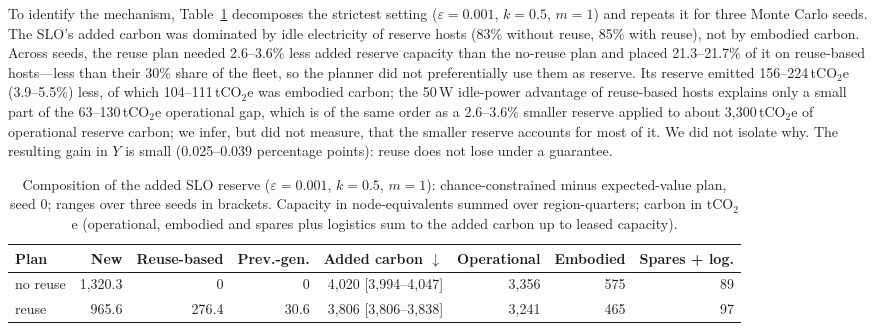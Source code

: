 \documentclass[11pt]{article}
\begin{document}
To identify the mechanism, Table~\ref{tab:reserve} decomposes the strictest setting ($\varepsilon=0.001$, $k=0.5$, $m=1$) and repeats it for three Monte Carlo seeds. The SLO's added carbon was dominated by idle electricity of reserve hosts (83\% without reuse, 85\% with reuse), not by embodied carbon. Across seeds, the reuse plan needed 2.6--3.6\% less added reserve capacity than the no-reuse plan and placed 21.3--21.7\% of it on reuse-based hosts---less than their 30\% share of the fleet, so the planner did not preferentially use them as reserve. Its reserve emitted 156--224\,tCO$_2$e (3.9--5.5\%) less, of which 104--111\,tCO$_2$e was embodied carbon; the 50\,W idle-power advantage of reuse-based hosts explains only a small part of the 63--130\,tCO$_2$e operational gap, which is of the same order as a 2.6--3.6\% smaller reserve applied to about 3{,}300\,tCO$_2$e of operational reserve carbon; we infer, but did not measure, that the smaller reserve accounts for most of it. We did not isolate why. The resulting gain in $Y$ is small (0.025--0.039 percentage points): reuse does not lose under a guarantee.

\begin{table}[!htbp]
  \centering
  \caption{Composition of the added SLO reserve ($\varepsilon=0.001$, $k=0.5$, $m=1$): chance-constrained minus expected-value plan, seed 0; ranges over three seeds in brackets. Capacity in node-equivalents summed over region-quarters; carbon in tCO$_2$e (operational, embodied and spares plus logistics sum to the added carbon up to leased capacity).}
  \label{tab:reserve}
  \small
  \begin{tabular}{lrrrrrrr}
    \toprule
    Plan & New & Reuse-based & Prev.-gen. & Added carbon $\downarrow$ & Operational & Embodied & Spares + log. \\
    \midrule
    no reuse & 1{,}320.3 & 0 & 0 & 4{,}020 [3{,}994--4{,}047] & 3{,}356 & 575 & 89 \\
    reuse & 965.6 & 276.4 & 30.6 & 3{,}806 [3{,}806--3{,}838] & 3{,}241 & 465 & 97 \\
    \bottomrule
  \end{tabular}
\end{table}
\end{document}

